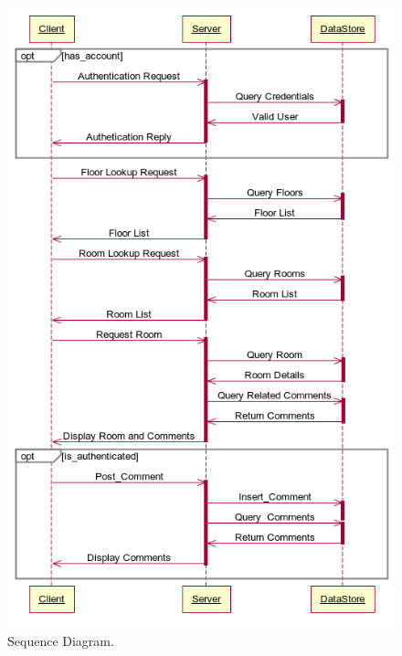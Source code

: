 \begin{figure}
                \includegraphics[scale=0.35]{img/dia.png}
                \caption{Sequence Diagram.}
                \label{img:diagram-sequence}
\end{figure}